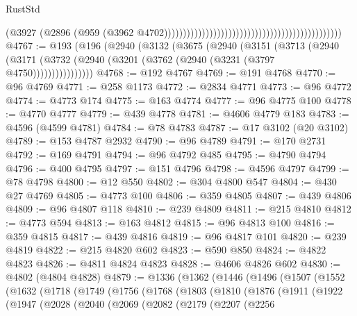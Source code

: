 \begin{lexlean}{RustStd}
\begin{coremodule}
                                                                                          (@3927
                                                                                            (@2896
                                                                                              (@959
                                                                                                (@3962
                                                                                                  @4702)))))))))))))))))))))))))))))))))))))))))))))))
@4767 := @193
    (@196
      (@2940
        (@3132
          (@3675
            (@2940
              (@3151
                (@3713
                  (@2940
                    (@3171 (@3732 (@2940 (@3201 (@3762 (@2940 (@3231 (@3797 @4750))))))))))))))))
@4768 := @192 @4767
@4769 := @191 @4768
@4770 := @96 @4769
@4771 := @258 @1173
@4772 := @2834 @4771
@4773 := @96 @4772
@4774 := @4773 @174
@4775 := @163 @4774
@4777 := @96 @4775 @100
@4778 := @4770 @4777
@4779 := @439 @4778
@4781 := @4606 @4779 @183
@4783 := @4596 (@4599 @4781)
@4784 := @78 @4783
@4787 := @17 @3102 (@20 @3102)
@4789 := @153 @4787 @2932
@4790 := @96 @4789
@4791 := @170 @2731
@4792 := @169 @4791
@4794 := @96 @4792 @485
@4795 := @4790 @4794
@4796 := @400 @4795
@4797 := @151 @4796
@4798 := @4596 @4797
@4799 := @78 @4798
@4800 := @12 @550
@4802 := @304 @4800 @547
@4804 := @430 @27 @4769
@4805 := @4773 @100
@4806 := @359 @4805
@4807 := @439 @4806
@4809 := @96 @4807 @118
@4810 := @239 @4809
@4811 := @215 @4810
@4812 := @4773 @594
@4813 := @163 @4812
@4815 := @96 @4813 @100
@4816 := @359 @4815
@4817 := @439 @4816
@4819 := @96 @4817 @101
@4820 := @239 @4819
@4822 := @215 @4820 @602
@4823 := @590 @850
@4824 := @4822 @4823
@4826 := @4811 @4824 @4823
@4828 := @4606 @4826 @602
@4830 := @4802 (@4804 @4828)
@4879 := @1336
    (@1362
      (@1446
        (@1496
          (@1507
            (@1552
              (@1632
                (@1718
                  (@1749
                    (@1756
                      (@1768
                        (@1803
                          (@1810
                            (@1876
                              (@1911
                                (@1922
                                  (@1947
                                    (@2028
                                      (@2040
                                        (@2069
                                          (@2082
                                            (@2179
                                              (@2207
                                                (@2256

\end{coremodule}
\end{lexlean}
